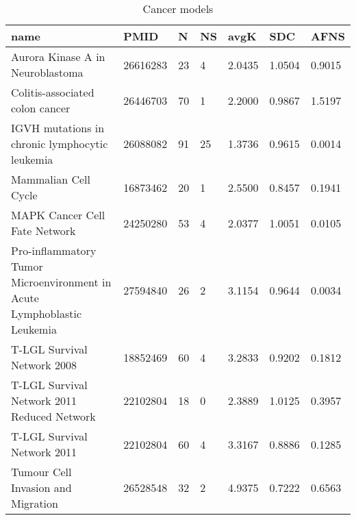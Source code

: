 \begin{table}
\caption{Cancer models}
\label{tab:Cancer}
\begin{tabular}{|p{180pt}||p{40pt}|p{25pt}|p{25pt}|p{40pt}|p{25pt}|p{25pt}|}
\toprule
name & PMID & N & NS & avgK & SDC & AFNS \\
\midrule
Aurora Kinase A in Neuroblastoma & 26616283 & 23 & 4 & 2.0435 & 1.0504 & 0.9015 \\
Colitis-associated colon cancer & 26446703 & 70 & 1 & 2.2000 & 0.9867 & 1.5197 \\
IGVH mutations in chronic lymphocytic leukemia & 26088082 & 91 & 25 & 1.3736 & 0.9615 & 0.0014 \\
Mammalian Cell Cycle & 16873462 & 20 & 1 & 2.5500 & 0.8457 & 0.1941 \\
MAPK Cancer Cell Fate Network & 24250280 & 53 & 4 & 2.0377 & 1.0051 & 0.0105 \\
Pro-inflammatory Tumor Microenvironment in Acute Lymphoblastic Leukemia & 27594840 & 26 & 2 & 3.1154 & 0.9644 & 0.0034 \\
T-LGL Survival Network 2008 & 18852469 & 60 & 4 & 3.2833 & 0.9202 & 0.1812 \\
T-LGL Survival Network 2011 Reduced Network & 22102804 & 18 & 0 & 2.3889 & 1.0125 & 0.3957 \\
T-LGL Survival Network 2011 & 22102804 & 60 & 4 & 3.3167 & 0.8886 & 0.1285 \\
Tumour Cell Invasion and Migration & 26528548 & 32 & 2 & 4.9375 & 0.7222 & 0.6563 \\
\bottomrule
\end{tabular}
\end{table}
